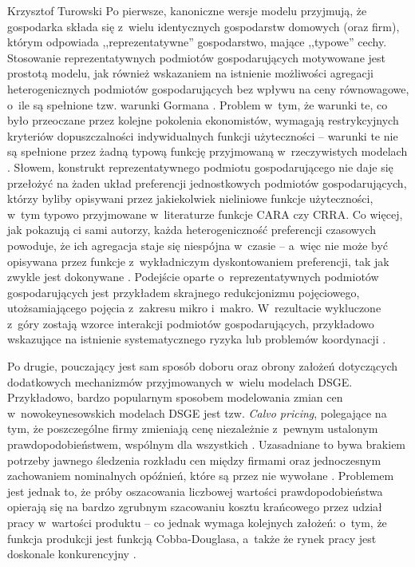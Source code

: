 \begin{artplenv}{Krzysztof Turowski}
Po pierwsze, kanoniczne wersje modelu przyjmują, że gospodarka składa się z~wielu identycznych gospodarstw domowych
(oraz firm), którym odpowiada ,,reprezentatywne'' gospodarstwo, mające ,,typowe'' cechy. Stosowanie reprezentatywnych
podmiotów gospodarujących motywowane jest prostotą modelu, jak również wskazaniem na istnienie możliwości agregacji heterogenicznych
podmiotów gospodarujących bez wpływu na ceny równowagowe, o~ile są spełnione tzw. warunki Gormana
\parencite{eichenbaum_estimating_1990}.
Problem w~tym, że warunki te, co było przeoczane przez kolejne pokolenia ekonomistów, wymagają
restrykcyjnych kryteriów dopuszczalności indywidualnych funkcji użyteczności  --  warunki te nie są
spełnione przez żadną typową funkcję przyjmowaną w~rzeczywistych modelach
\parencite{jackson_non-existence_2017}.
Słowem, konstrukt reprezentatywnego podmiotu gospodarującego nie daje się przełożyć na żaden układ preferencji jednostkowych
podmiotów gospodarujących, którzy byliby opisywani przez jakiekolwiek nieliniowe funkcje użyteczności, w~tym typowo
przyjmowane w~literaturze funkcje CARA czy CRRA. Co więcej, jak pokazują ci sami autorzy, każda heterogeniczność preferencji
czasowych powoduje, że ich agregacja staje się niespójna w~czasie  --  a~więc nie może być opisywana przez
funkcje z~wykładniczym dyskontowaniem preferencji, tak jak zwykle jest dokonywane
\parencite{jackson_collective_2015}.
Podejście oparte o~reprezentatywnych podmiotów gospodarujących jest przykładem skrajnego redukcjonizmu pojęciowego,
utożsamiającego pojęcia z~zakresu mikro i~makro. W~rezultacie wykluczone z~góry zostają wzorce interakcji podmiotów gospodarujących,
przykładowo wskazujące na istnienie systematycznego ryzyka lub problemów koordynacji
\parencite{colander_financial_2009}.

Po drugie, pouczający jest sam sposób doboru oraz obrony założeń dotyczących dodatkowych mechanizmów przyjmowanych w~wielu
modelach DSGE. Przykładowo, bardzo popularnym sposobem modelowania zmian cen w~nowokeynesowskich modelach DSGE jest
tzw. \textit{Calvo pricing}, polegające na tym, że poszczególne firmy zmieniają cenę niezależnie z~pewnym ustalonym
prawdopodobieństwem, wspólnym dla wszystkich
\parencite{calvo_staggered_1983}.
Uzasadniane to bywa brakiem
potrzeby jawnego śledzenia rozkładu cen między firmami oraz jednoczesnym zachowaniem nominalnych opóźnień, które są
przez nie wywołane
\parencite{christiano_nominal_2005}.
Problemem jest jednak to, że próby oszacowania
liczbowej wartości prawdopodobieństwa opierają się na bardzo zgrubnym szacowaniu kosztu krańcowego przez udział
pracy w~wartości produktu  --  co jednak wymaga kolejnych założeń: o~tym, że funkcja produkcji jest funkcją
Cobba-Douglasa, a~także że rynek pracy jest doskonale konkurencyjny
\parencite{wolman_sticky_1999}.


\end{artplenv}
